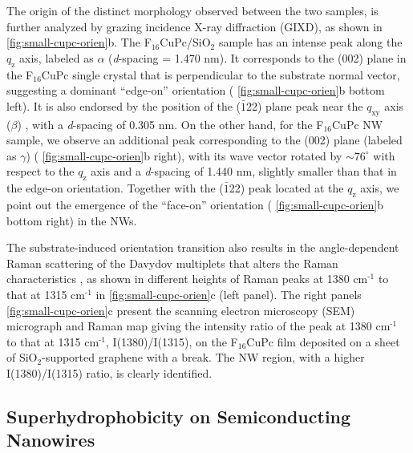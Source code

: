 The origin of the distinct morphology observed between the two
samples, is further analyzed by grazing incidence X-ray diffraction
(GIXD), as shown in \autoref{fig:small-cupc-orien}b.
The F\(_{\text{16}}\)CuPc/SiO\(_{\text{2}}\) sample has an intense
peak along the \(q_{\mathrm{z}}\) axis, labeled as \(\alpha\)
(\emph{d}-spacing = 1.470 nm). It corresponds to the (002) plane in
the F\(_{\text{16}}\)CuPc single crystal \cite{Yang_2009_F16_PTCDA}
that is perpendicular to the substrate normal vector, suggesting a
dominant ``edge-on'' orientation ( \autoref{fig:small-cupc-orien}b
bottom left). It is also endorsed by the position of the
(\(\bar{1}\)22) plane peak near the \(q_{\mathrm{xy}}\) axis
(\(\beta\)) \cite{Yoon_2010_crystal_F16cuPc}, with a \emph{d}-spacing
of 0.305 nm. On the other hand, for the F\(_{\text{16}}\)CuPc NW
sample, we observe an additional peak corresponding to the (002) plane
(labeled as \(\gamma\)) ( \autoref{fig:small-cupc-orien}b right), with
its wave vector rotated by \(\sim 76^{\circ}\) with respect to the
\(q_{\mathrm{z}}\) axis and a \emph{d}-spacing of 1.440 nm, slightly
smaller than that in the edge-on orientation. Together with the
(\(\bar{1}\)22) peak located at the \(q_{\mathrm{z}}\) axis, we point
out the emergence of the ``face-on'' orientation (
\autoref{fig:small-cupc-orien}b bottom right) in the NWs.


The substrate-induced orientation transition also results in the
angle-dependent Raman scattering of the Davydov multiplets that alters
the Raman characteristics \cite{Cerdeira_2013_RamanF16}, as shown in
different heights of Raman peaks at 1380 cm\(^{\text{-1}}\) to that at
1315 cm\(^{\text{-1}}\) in \autoref{fig:small-cupc-orien}c (left
panel).  The right panels \autoref{fig:small-cupc-orien}c present the scanning
electron microscopy (SEM) micrograph and Raman map giving the
intensity ratio of the peak at 1380 cm\(^{\text{-1}}\) to that at 1315
cm\(^{\text{-1}}\), I(1380)/I(1315), on the F\(_{\text{16}}\)CuPc film
deposited on a sheet of SiO\(_{\text{2}}\)-supported graphene with a
break. The NW region, with a higher I(1380)/I(1315) ratio, is clearly
identified.


\subsection*{Superhydrophobicity on Semiconducting Nanowires}
\label{sec:small-superhydr-nw}


